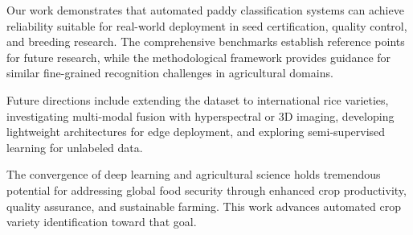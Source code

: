 \documentclass[conference]{IEEEtran}
\begin{document}
Our work demonstrates that automated paddy classification systems can achieve reliability suitable for real-world deployment in seed certification, quality control, and breeding research. The comprehensive benchmarks establish reference points for future research, while the methodological framework provides guidance for similar fine-grained recognition challenges in agricultural domains.

Future directions include extending the dataset to international rice varieties, investigating multi-modal fusion with hyperspectral or 3D imaging, developing lightweight architectures for edge deployment, and exploring semi-supervised learning for unlabeled data. 

The convergence of deep learning and agricultural science holds tremendous potential for addressing global food security through enhanced crop productivity, quality assurance, and sustainable farming. This work advances automated crop variety identification toward that goal.



\end{document}
